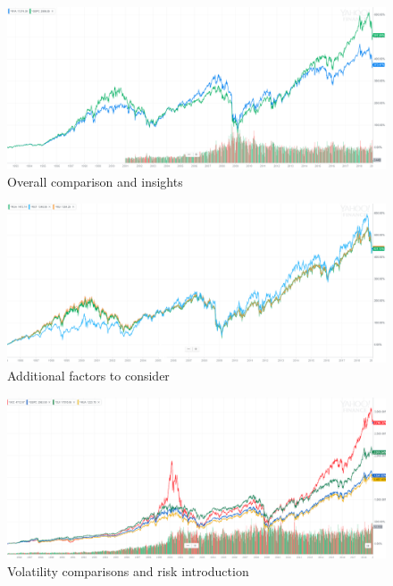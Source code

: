 \documentclass{article}
\begin{document}
\vspace{10pt}

\begin{figure}[!htb]
    \centering
    \includegraphics[width=\textwidth]{imgs/14.png}
    \caption{Overall comparison and insights}
\end{figure}

\vspace{10pt}

\begin{figure}[!htb]
    \centering
    \includegraphics[width=\textwidth]{imgs/15.png}
    \caption{Additional factors to consider}
\end{figure}

\vspace{10pt}

\begin{figure}[!htb]
    \centering
    \includegraphics[width=\textwidth]{imgs/16.png}
    \caption{Volatility comparisons and risk introduction}
\end{figure}
\end{document}
